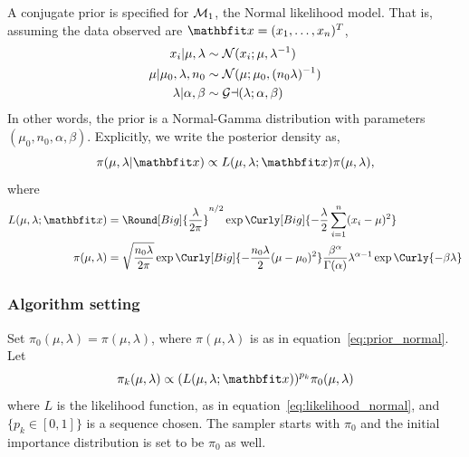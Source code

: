 A conjugate prior is specified for $\mathcal{M}_1$, the Normal likelihood model.
That is, assuming the data observed are $\bfx = (x_1,\dots,x_n)^T$,
\begin{align}
  x_i | \mu,\lambda &\sim \mathcal{N}(x_i; \mu, \lambda^{-1}) \\
  \mu | \mu_0,\lambda,n_0 &\sim \mathcal{N}(\mu; \mu_0, (n_0\lambda)^{-1}) \\
  \lambda | \alpha,\beta &\sim \mathcal{Ga}(\lambda; \alpha, \beta)
\end{align}
In other words, the prior is a Normal-Gamma distribution with parameters
$(\mu_0, n_0, \alpha, \beta)$. Explicitly, we write the posterior density
as,
\begin{equation}
  \pi(\mu,\lambda|\bfx) \propto
  L(\mu,\lambda;\bfx)\pi(\mu,\lambda),
  \label{eq:normal_posterior}
\end{equation}
where
\begin{align}
  L(\mu,\lambda;\bfx) &= \Round[Big]{\frac{\lambda}{2\pi}}^{n/2}
  \exp\Curly[Big]{-\frac{\lambda}{2}\sum_{i=1}^n(x_i - \mu)^2}
  \label{eq:likelihood_normal}\\
  \pi(\mu,\lambda) &= \sqrt{\frac{n_0\lambda}{2\pi}}
  \exp\Curly[Big]{-\frac{n_0\lambda}{2}(\mu - \mu_0)^2}
  \frac{\beta^{\alpha}}{\Gamma(\alpha)}
  \lambda^{\alpha - 1}\exp\Curly{-\beta\lambda}
  \label{eq:prior_normal}
\end{align}

\subsubsection{Algorithm setting}

Set $\pi_0(\mu,\lambda) = \pi(\mu,\lambda)$, where $\pi(\mu,\lambda)$ is as
in equation~\ref{eq:prior_normal}. Let
\begin{equation}
  \pi_k(\mu,\lambda) \propto (L(\mu,\lambda;\bfx))^{p_k}\pi_0(\mu,\lambda)
  \label{eq:normal_targets}
\end{equation}
where $L$ is the likelihood function, as in
equation~\eqref{eq:likelihood_normal}, and $\{p_k\in[0,1]\}$ is a sequence
chosen. The \smc sampler starts with $\pi_0$ and the initial importance
distribution is set to be $\pi_0$ as well.

